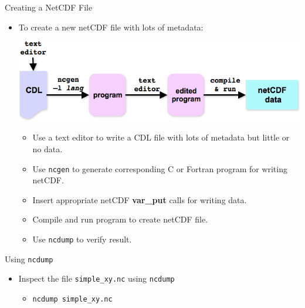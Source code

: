\documentclass[compress,11pt,xcolor=svgnames,aspectratio=169]{beamer}
\begin{document}
\begin{frame}[fragile]{Creating a NetCDF File}

\begin{itemize}
  \item To create a new netCDF file with lots of metadata:\\[0.3cm]

\begin{center}
\includegraphics[scale=0.5]{fig/nc-creat}
\end{center}

    \begin{itemize}
    \setlength\itemsep{0.1cm}
      \item Use a text editor to write a CDL file with lots of metadata but little or no data.
      \item Use \texttt{ncgen} to generate corresponding C or Fortran program for writing netCDF.
      \item Insert appropriate netCDF \textbf{var\_put} calls for writing data.
      \item Compile and run program to create netCDF file.
      \item Use \texttt{ncdump} to verify result.
    \end{itemize}

\end{itemize}

\end{frame}

\begin{frame}[fragile]{Using \texttt{ncdump}}

\begin{itemize}

  \item Inspect the file \verb|simple_xy.nc| using \texttt{ncdump}\\[0.4cm]

  \begin{itemize}
  \setlength\itemsep{0.5cm}

    \item \verb|ncdump simple_xy.nc|

  \end{itemize}

\end{itemize}

\end{frame}
\end{document}
